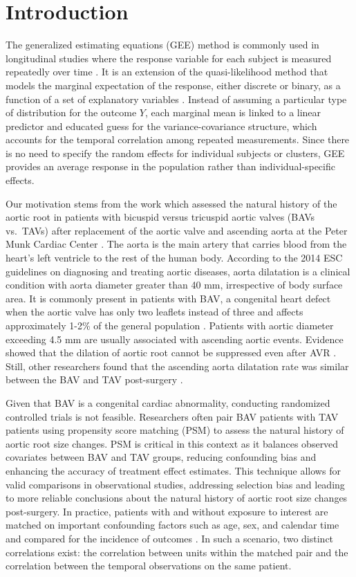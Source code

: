 \documentclass[
]{aft}
\begin{document}
\section{Introduction}\label{sec-intro}

The generalized estimating equations (GEE) method is commonly used in
longitudinal studies where the response variable for each subject is
measured repeatedly over time \citep{LiangZeger1986}. It is an extension
of the quasi-likelihood method that models the marginal expectation of
the response, either discrete or binary, as a function of a set of
explanatory variables \citep{Agresti2nd}. Instead of assuming a
particular type of distribution for the outcome \(Y\), each marginal
mean is linked to a linear predictor and educated guess for the
variance-covariance structure, which accounts for the temporal
correlation among repeated measurements. Since there is no need to
specify the random effects for individual subjects or clusters, GEE
provides an average response in the population rather than
individual-specific effects.

Our motivation stems from the work which assessed the natural history of
the aortic root in patients with bicuspid versus tricuspid aortic valves
(BAVs vs.~TAVs) after replacement of the aortic valve and ascending
aorta at the Peter Munk Cardiac Center \citep{Hui2018}. The aorta is the
main artery that carries blood from the heart's left ventricle to the
rest of the human body. According to the 2014 ESC guidelines on
diagnosing and treating aortic diseases, aorta dilatation is a clinical
condition with aorta diameter greater than 40 mm, irrespective of body
surface area. It is commonly present in patients with BAV, a congenital
heart defect when the aortic valve has only two leaflets instead of
three and affects approximately 1-2\% of the general population
\citep{Wang2021}. Patients with aortic diameter exceeding 4.5 mm are
usually associated with ascending aortic events. Evidence showed that
the dilation of aortic root cannot be suppressed even after AVR
\citep{Bruce2003}. Still, other researchers found that the ascending
aorta dilatation rate was similar between the BAV and TAV post-surgery
\citep{KIM202053}.

Given that BAV is a congenital cardiac abnormality, conducting
randomized controlled trials is not feasible. Researchers often pair BAV
patients with TAV patients using propensity score matching (PSM) to
assess the natural history of aortic root size changes. PSM is critical
in this context as it balances observed covariates between BAV and TAV
groups, reducing confounding bias and enhancing the accuracy of
treatment effect estimates. This technique allows for valid comparisons
in observational studies, addressing selection bias and leading to more
reliable conclusions about the natural history of aortic root size
changes post-surgery. In practice, patients with and without exposure to
interest are matched on important confounding factors such as age, sex,
and calendar time and compared for the incidence of outcomes
\citep{Iwagami2022}. In such a scenario, two distinct correlations
exist: the correlation between units within the matched pair and the
correlation between the temporal observations on the same patient.
\end{document}
